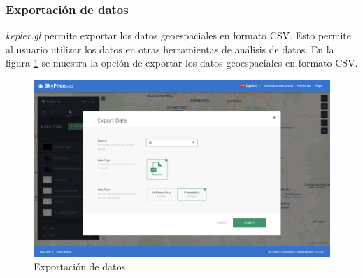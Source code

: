 \subsubsection{Exportación de datos}
\textit{kepler.gl} permite exportar los datos geoespaciales en formato CSV. Esto
permite al usuario utilizar los datos en otras herramientas de análisis de datos.
En la figura \ref{fig:avanzado-exportacion-datos} se muestra la opción de exportar
los datos geoespaciales en formato CSV.

\begin{figure}[H]
    \centering
    \includegraphics[width=1.0\textwidth]{imagenes/05-mapa-interactivo/avanzado-exportar-datos.png}
    \caption{Exportación de datos}
    \label{fig:avanzado-exportacion-datos}
\end{figure}

